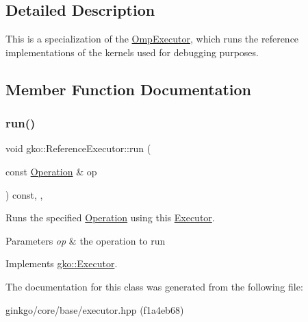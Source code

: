 \subsection{Detailed Description}
This is a specialization of the \hyperlink{classgko_1_1OmpExecutor}{Omp\+Executor}, which runs the reference implementations of the kernels used for debugging purposes. 

\subsection{Member Function Documentation}
\mbox{\label{classgko_1_1ReferenceExecutor_a82b41b42dbd26e8ac5b0146de79e5d34}} 
\subsubsection{\texorpdfstring{run()}{run()}}
{\footnotesize\ttfamily void gko\+::\+Reference\+Executor\+::run (\begin{DoxyParamCaption}\item[{const \hyperlink{classgko_1_1Operation}{Operation} \&}]{op }\end{DoxyParamCaption}) const\hspace{0.3cm}{\ttfamily [inline]}, {\ttfamily [override]}, {\ttfamily [virtual]}}



Runs the specified \hyperlink{classgko_1_1Operation}{Operation} using this \hyperlink{classgko_1_1Executor}{Executor}. 


\begin{DoxyParams}{Parameters}
{\em op} & the operation to run \\
\hline
\end{DoxyParams}


Implements \hyperlink{classgko_1_1Executor_a1de8e2668b76e66690acf5eef9e8324d}{gko\+::\+Executor}.



The documentation for this class was generated from the following file\+:\begin{DoxyCompactItemize}
\item 
ginkgo/core/base/executor.\+hpp (f1a4eb68)\end{DoxyCompactItemize}
